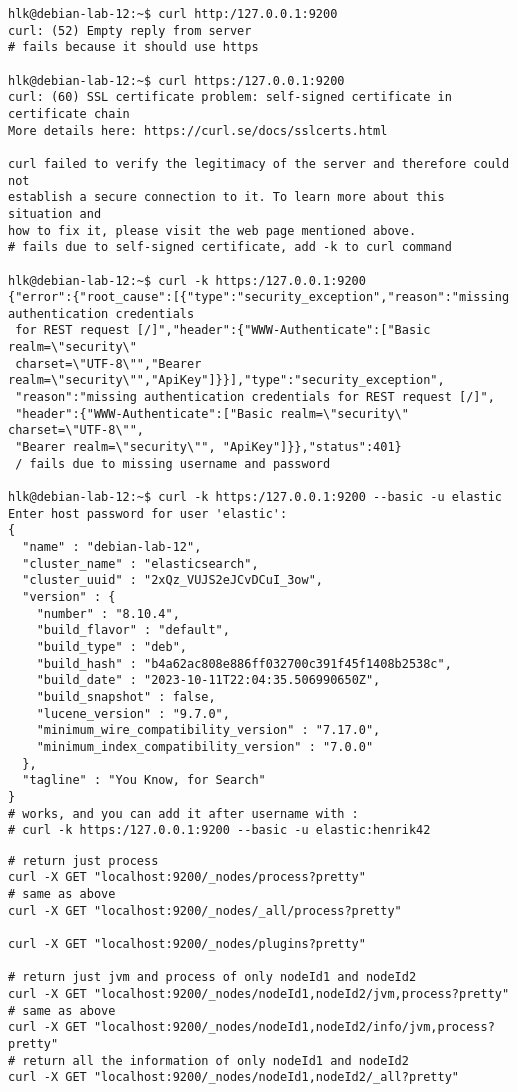 \documentclass[a4paper,11pt,notitlepage]{report}
\begin{document}
\begin{verbatim}
hlk@debian-lab-12:~$ curl http:/127.0.0.1:9200
curl: (52) Empty reply from server
# fails because it should use https

hlk@debian-lab-12:~$ curl https:/127.0.0.1:9200
curl: (60) SSL certificate problem: self-signed certificate in certificate chain
More details here: https://curl.se/docs/sslcerts.html

curl failed to verify the legitimacy of the server and therefore could not
establish a secure connection to it. To learn more about this situation and
how to fix it, please visit the web page mentioned above.
# fails due to self-signed certificate, add -k to curl command

hlk@debian-lab-12:~$ curl -k https:/127.0.0.1:9200
{"error":{"root_cause":[{"type":"security_exception","reason":"missing authentication credentials
 for REST request [/]","header":{"WWW-Authenticate":["Basic realm=\"security\"
 charset=\"UTF-8\"","Bearer realm=\"security\"","ApiKey"]}}],"type":"security_exception",
 "reason":"missing authentication credentials for REST request [/]",
 "header":{"WWW-Authenticate":["Basic realm=\"security\" charset=\"UTF-8\"",
 "Bearer realm=\"security\"", "ApiKey"]}},"status":401}
 / fails due to missing username and password

hlk@debian-lab-12:~$ curl -k https:/127.0.0.1:9200 --basic -u elastic
Enter host password for user 'elastic':
{
  "name" : "debian-lab-12",
  "cluster_name" : "elasticsearch",
  "cluster_uuid" : "2xQz_VUJS2eJCvDCuI_3ow",
  "version" : {
    "number" : "8.10.4",
    "build_flavor" : "default",
    "build_type" : "deb",
    "build_hash" : "b4a62ac808e886ff032700c391f45f1408b2538c",
    "build_date" : "2023-10-11T22:04:35.506990650Z",
    "build_snapshot" : false,
    "lucene_version" : "9.7.0",
    "minimum_wire_compatibility_version" : "7.17.0",
    "minimum_index_compatibility_version" : "7.0.0"
  },
  "tagline" : "You Know, for Search"
}
# works, and you can add it after username with :
# curl -k https:/127.0.0.1:9200 --basic -u elastic:henrik42

\end{verbatim}

\begin{verbatim}
# return just process
curl -X GET "localhost:9200/_nodes/process?pretty"
# same as above
curl -X GET "localhost:9200/_nodes/_all/process?pretty"

curl -X GET "localhost:9200/_nodes/plugins?pretty"

# return just jvm and process of only nodeId1 and nodeId2
curl -X GET "localhost:9200/_nodes/nodeId1,nodeId2/jvm,process?pretty"
# same as above
curl -X GET "localhost:9200/_nodes/nodeId1,nodeId2/info/jvm,process?pretty"
# return all the information of only nodeId1 and nodeId2
curl -X GET "localhost:9200/_nodes/nodeId1,nodeId2/_all?pretty"
\end{verbatim}
\end{document}
